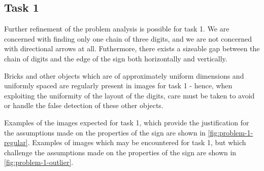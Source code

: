 \documentclass{article}
\begin{document}
\subsection{Task 1}
\label{sec:problem-1}

Further refinement of the problem analysis is possible for task 1.
We are concerned with finding only one chain of three digits, and we are not
concerned with directional arrows at all.
Futhermore, there exists a sizeable gap between the chain of digits and the edge
of the sign both horizontally and vertically.

Bricks and other objects which are of approximately uniform dimensions and
uniformly spaced are regularly present in images for task 1 - hence, when
exploiting the uniformity of the layout of the digits, care must be taken to
avoid or handle the false detection of these other objects.

Examples of the images expected for task 1, which provide the justification for
the assumptions made on the properties of the sign are shown in
\autoref{fig:problem-1-regular}.
Examples of images which may be encountered for task 1, but which challenge the
assumptions made on the properties of the sign are shown in
\autoref{fig:problem-1-outlier}.
\end{document}
